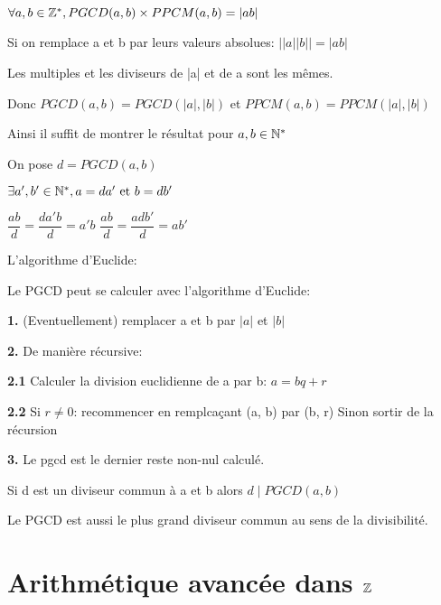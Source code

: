 \documentclass[a4paper, 12pt]{article}
\begin{document}
\begin{proposition}
    $\forall a, b \in \mathbb{Z}^*, PGCD(a, b) \times PPCM(a, b) = |ab|$
\end{proposition}

\begin{demonstration}
    Si on remplace a et b par leurs valeurs absolues: $||a||b|| = |ab|$

    Les multiples et les diviseurs de |a| et de a sont les mêmes.

    Donc $PGCD(a, b) = PGCD(|a|, |b|)$ et $PPCM(a, b) = PPCM(|a|, |b|)$

    Ainsi il suffit de montrer le résultat pour $a, b \in \mathbb{N}^*$

    On pose $d = PGCD(a, b)$

    $\exists a', b' \in \mathbb{N}^*, a = da' \text{ et } b = db'$

    $\dfrac{ab}{d} = \dfrac{da'b}{d} = a'b$
    $\dfrac{ab}{d} = \dfrac{adb'}{d} = ab'$
\end{demonstration}

\begin{methode}
L'algorithme d'Euclide:

Le PGCD peut se calculer avec l'algorithme d'Euclide:

\item \textbf{1.} (Eventuellement) remplacer a et b par $|a|$ et $|b|$
\item \textbf{2.} De manière récursive:
\item \textbf{2.1} Calculer la division euclidienne de a par b: $a = bq + r$
\item \textbf{2.2} Si $r \neq 0$: recommencer en remplcaçant (a, b) par (b, r) Sinon sortir de la récursion
\item \textbf{3.} Le pgcd est le dernier reste non-nul calculé.
\end{methode}

\begin{proposition}
    Si d est un diviseur commun à a et b alors $d \mid PGCD(a, b)$
\end{proposition}

\begin{corollaire}
    Le PGCD est aussi le plus grand diviseur commun au sens de la divisibilité.
\end{corollaire}




\section{Arithmétique avancée dans $\mathbb{Z}$}
\end{document}
